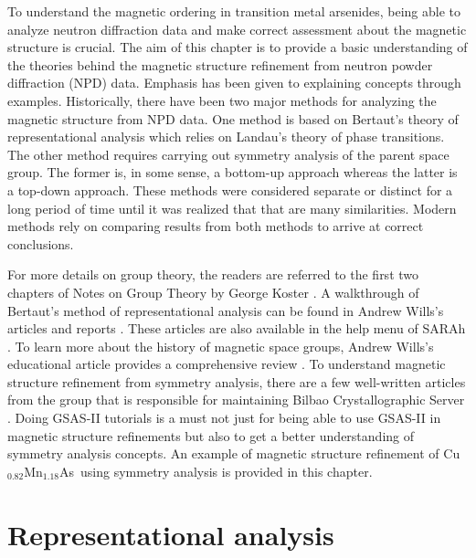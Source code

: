 \documentclass[letterpaper,10pt,doublespacing,edeposit]{uiucthesis2020}
\newcommand*{\cumnas}{Cu$_{0.82}$Mn$_{1.18}$As}
\begin{document}
\begin{mainmatter}
To understand the magnetic ordering in transition metal arsenides, being able to analyze neutron diffraction data and make correct assessment about the magnetic structure is crucial. The aim of this chapter is to provide a basic understanding of the theories behind the magnetic structure refinement from neutron powder diffraction (NPD) data. Emphasis has been given to explaining concepts through examples. Historically, there have been two major methods for analyzing the magnetic structure from NPD data. One method is based on Bertaut's theory of representational analysis which relies on Landau's theory of phase transitions. The other method requires carrying out symmetry analysis of the parent space group. The former is, in some sense, a bottom-up approach whereas the latter is a top-down approach. These methods were considered separate or distinct for a long period of time until it was realized that that are many similarities. Modern methods rely on comparing results from both methods to arrive at correct conclusions.

For more details on group theory, the readers are referred to the first two chapters of Notes on Group Theory by George Koster \cite{Koster1956}. A walkthrough of Bertaut's method of representational analysis can be found in Andrew Wills's articles and reports \cite{Wills2001,Wills2019}. These articles are also available in the help menu of SARAh \cite{WILLS2000680,Wills2009}. To learn more about the history of magnetic space groups, Andrew Wills's educational article provides a comprehensive review \cite{Wills2017}. To understand magnetic structure refinement from symmetry analysis, there are a few well-written articles from the group that is responsible for maintaining Bilbao Crystallographic Server \cite{Perez-Mato2015,Gallego2016_1,Gallego2016_2}.  Doing \textsc{GSAS-II} \cite{Toby:aj5212} tutorials is a must not just for being able to use \textsc{GSAS-II} in magnetic structure refinements but also to get a better understanding of symmetry analysis concepts. An example of magnetic structure refinement of \cumnas\ using symmetry analysis is provided in this chapter.


\section{Representational analysis}


\end{mainmatter}
\end{document}
